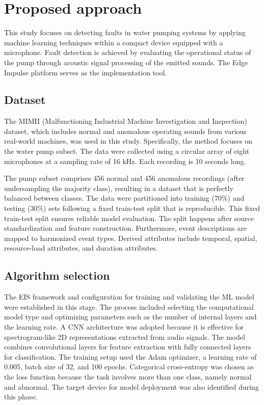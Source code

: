 \section{Proposed approach}\label{sec:approach}

This study focuses on detecting faults in water pumping systems by applying machine learning techniques within a compact device equipped with a microphone. Fault detection is achieved by evaluating the operational status of the pump through acoustic signal processing of the emitted sounds. The Edge Impulse platform serves as the implementation tool.

\subsection{Dataset}

The MIMII (Malfunctioning Industrial Machine Investigation and Inspection) dataset, which includes normal and anomalous operating sounds from various real-world machines, was used in this study. Specifically, the method focuses on the water pump subset. The data were collected using a circular array of eight microphones at a sampling rate of 16 kHz. Each recording is 10 seconds long.

The pump subset comprises 456 normal and 456 anomalous recordings (after undersampling the majority class), resulting in a dataset that is perfectly balanced between classes. The data were partitioned into training (70\%) and testing (30\%) sets following a fixed train-test split that is reproducible. This fixed train-test split ensures reliable model evaluation. The split happens after source standardization and feature construction. Furthermore, event descriptions are mapped to harmonized event types. Derived attributes include temporal, spatial, resource-load attributes, and duration attributes.

\subsection{Algorithm selection}

The EIS framework and configuration for training and validating the ML model were established in this stage. The process included selecting the computational model type and optimizing parameters such as the number of internal layers and the learning rate. A CNN architecture was adopted because it is effective for spectrogram-like 2D representations extracted from audio signals. The model combines convolutional layers for feature extraction with fully connected layers for classification. The training setup used the Adam optimizer, a learning rate of 0.005, batch size of 32, and 100 epochs. Categorical cross-entropy was chosen as the loss function because the task involves more than one class, namely normal and abnormal. The target device for model deployment was also identified during this phase.

